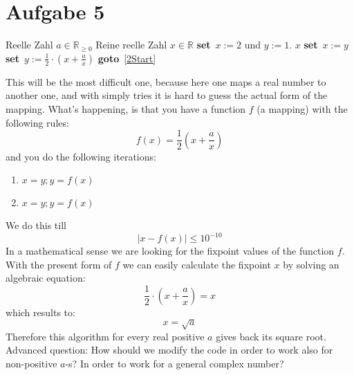 \documentclass{article}[12pt]
\newcommand{\SET}{\textbf{set}\ }
\newcommand{\GOTO}{\textbf{goto}\ }
\begin{document}
\section{Aufgabe 5}
\begin{algorithm}[H]
\caption{}
\begin{algorithmic}[1]
\REQUIRE Reelle Zahl $a\in\mathbb{R}_{\ge 0}$
\ENSURE Reine reelle Zahl $x\in\mathbb{R}$
\STATE \SET $x := 2$ und $y := 1$.
 \label{2Start} 
\RETURN $x$
\ENDIF
\STATE \SET $x := y$
\STATE \SET $y := \frac{1}{2} \cdot \left(x+\frac{a}{x}\right)$
\STATE \GOTO \ref{2Start}
\end{algorithmic}
\end{algorithm}
This will be the most difficult one, because here one maps a real number to another one, and with simply tries it is 
hard to guess the actual form of the mapping. What's happening, is that you have a function $f$ (a mapping) with the 
following rules:
\begin{equation}
f(x)=\frac{1}{2}\left(x+\frac{a}{x}\right)
\end{equation}
and you do the following iterations:
\begin{enumerate}
\item $x=y;y=f(x)$
\item $x=y;y=f(x)$
\end{enumerate}
We do this till 
\begin{equation}
\vert x-f(x) \vert \le 10^{-10}
\end{equation}
In a mathematical sense we are looking for the fixpoint values of the function $f$. With the present form of $f$ we can
easily calculate the fixpoint $x$ by solving an algebraic equation:
\begin{equation}
\frac{1}{2} \cdot \left(x+\frac{a}{x}\right)=x
\end{equation}
which results to:
\begin{equation}
x=\sqrt{a}
\end{equation}
Therefore this algorithm for every real positive $a$ gives back its square root.
Advanced question: How should we modify the code in order to work also for non-positive $a$-s?
In order to work for a general complex number?
\end{document}
